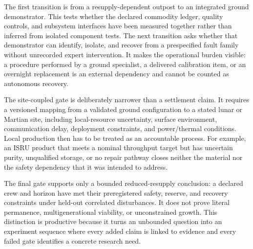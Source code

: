 \documentclass[10pt,conference]{IEEEtran}
\begin{document}
The first transition is from a resupply-dependent outpost to an integrated ground demonstrator. This tests whether the declared commodity ledger, quality controls, and subsystem interfaces have been measured together rather than inferred from isolated component tests. The next transition asks whether that demonstrator can identify, isolate, and recover from a prespecified fault family without unrecorded expert intervention. It makes the operational burden visible: a procedure performed by a ground specialist, a delivered calibration item, or an overnight replacement is an external dependency and cannot be counted as autonomous recovery.

The site-coupled gate is deliberately narrower than a settlement claim. It requires a versioned mapping from a validated ground configuration to a stated lunar or Martian site, including local-resource uncertainty, surface environment, communication delay, deployment constraints, and power/thermal conditions. Local production then has to be treated as an accountable process. For example, an ISRU product that meets a nominal throughput target but has uncertain purity, unqualified storage, or no repair pathway closes neither the material nor the safety dependency that it was intended to address.

The final gate supports only a bounded reduced-resupply conclusion: a declared crew and horizon have met their preregistered safety, reserve, and recovery constraints under held-out correlated disturbances. It does not prove literal permanence, multigenerational viability, or unconstrained growth. This distinction is productive because it turns an unbounded question into an experiment sequence where every added claim is linked to evidence and every failed gate identifies a concrete research need.
\end{document}
